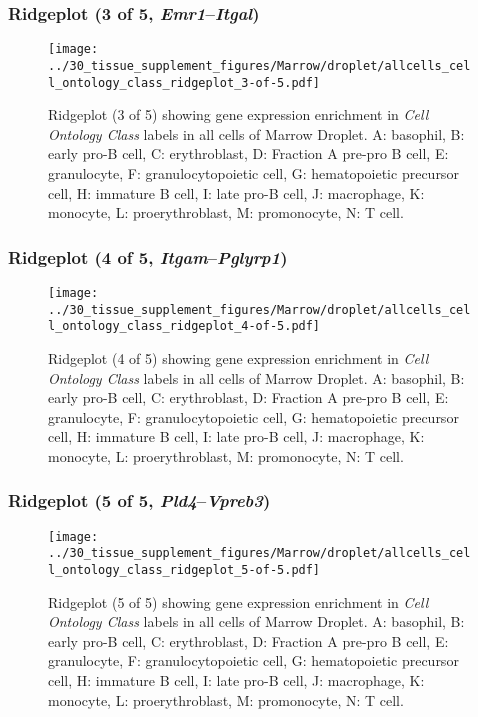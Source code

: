 \clearpage

\subsubsection{Ridgeplot (3 of 5, \emph{Emr1}--\emph{Itgal})}
\begin{figure}[h]
\centering
\texttt{[image: ../30\_tissue\_supplement\_figures/Marrow/droplet/allcells\_cell\_ontology\_class\_ridgeplot\_3-of-5.pdf]}

\caption{ Ridgeplot (3 of 5)  showing gene expression enrichment in \emph{Cell Ontology Class} labels in all cells of Marrow Droplet. A: basophil, B: early pro-B cell, C: erythroblast, D: Fraction A pre-pro B cell, E: granulocyte, F: granulocytopoietic cell, G: hematopoietic precursor cell, H: immature B cell, I: late pro-B cell, J: macrophage, K: monocyte, L: proerythroblast, M: promonocyte, N: T cell.}
\end{figure}


\clearpage

\subsubsection{Ridgeplot (4 of 5, \emph{Itgam}--\emph{Pglyrp1})}
\begin{figure}[h]
\centering
\texttt{[image: ../30\_tissue\_supplement\_figures/Marrow/droplet/allcells\_cell\_ontology\_class\_ridgeplot\_4-of-5.pdf]}

\caption{ Ridgeplot (4 of 5)  showing gene expression enrichment in \emph{Cell Ontology Class} labels in all cells of Marrow Droplet. A: basophil, B: early pro-B cell, C: erythroblast, D: Fraction A pre-pro B cell, E: granulocyte, F: granulocytopoietic cell, G: hematopoietic precursor cell, H: immature B cell, I: late pro-B cell, J: macrophage, K: monocyte, L: proerythroblast, M: promonocyte, N: T cell.}
\end{figure}


\clearpage

\subsubsection{Ridgeplot (5 of 5, \emph{Pld4}--\emph{Vpreb3})}
\begin{figure}[h]
\centering
\texttt{[image: ../30\_tissue\_supplement\_figures/Marrow/droplet/allcells\_cell\_ontology\_class\_ridgeplot\_5-of-5.pdf]}

\caption{ Ridgeplot (5 of 5)  showing gene expression enrichment in \emph{Cell Ontology Class} labels in all cells of Marrow Droplet. A: basophil, B: early pro-B cell, C: erythroblast, D: Fraction A pre-pro B cell, E: granulocyte, F: granulocytopoietic cell, G: hematopoietic precursor cell, H: immature B cell, I: late pro-B cell, J: macrophage, K: monocyte, L: proerythroblast, M: promonocyte, N: T cell.}
\end{figure}


